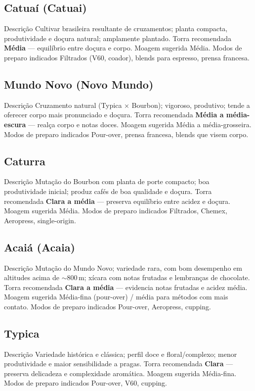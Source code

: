 \documentclass[a4paper,12pt]{article}
\begin{document}
\subsection{Catuaí (Catuai)}
{Descrição} Cultivar brasileira resultante de cruzamentos; planta compacta, produtividade e doçura natural; amplamente plantado.  
{Torra recomendada} \textbf{Média} — equilíbrio entre doçura e corpo.  
{Moagem sugerida} Média.  
{Modos de preparo indicados} Filtrados (V60, coador), blends para espresso, prensa francesa.

\subsection{Mundo Novo (Novo Mundo)}
{Descrição} Cruzamento natural (Typica × Bourbon); vigoroso, produtivo; tende a oferecer corpo mais pronunciado e doçura.  
{Torra recomendada} \textbf{Média a média-escura} — realça corpo e notas doces.  
{Moagem sugerida} Média a média-grosseira.  
{Modos de preparo indicados} Pour-over, prensa francesa, blends que visem corpo.

\subsection{Caturra}
{Descrição} Mutação do Bourbon com planta de porte compacto; boa produtividade inicial; produz cafés de boa qualidade e doçura.  
{Torra recomendada} \textbf{Clara a média} — preserva equilíbrio entre acidez e doçura.  
{Moagem sugerida} Média.  
{Modos de preparo indicados} Filtrados, Chemex, Aeropress, single-origin.

\subsection{Acaiá (Acaia)}
{Descrição} Mutação do Mundo Novo; variedade rara, com bom desempenho em altitudes acima de \(\sim\)800\,m; xícara com notas frutadas e lembranças de chocolate.  
{Torra recomendada} \textbf{Clara a média} — evidencia notas frutadas e acidez média.  
{Moagem sugerida} Média-fina (pour-over) / média para métodos com mais contato.  
{Modos de preparo indicados} Pour-over, Aeropress, cupping.

\subsection{Typica}
{Descrição} Variedade histórica e clássica; perfil doce e floral/complexo; menor produtividade e maior sensibilidade a pragas.  
{Torra recomendada} \textbf{Clara} — preserva delicadeza e complexidade aromática.  
{Moagem sugerida} Média-fina.  
{Modos de preparo indicados} Pour-over, V60, cupping.
\end{document}
